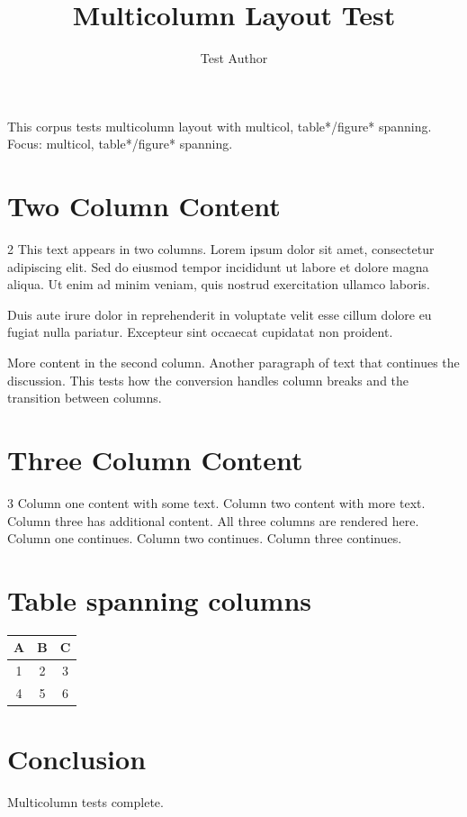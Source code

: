 \documentclass{article}
\title{Multicolumn Layout Test}
\author{Test Author}
\begin{document}
\maketitle

\begin{abstrct}
This corpus tests multicolumn layout with multicol, table*/figure* spanning.
Focus: multicol, table*/figure* spanning.
\end{abstrct}

\section{Two Column Content}

\begin{multicols}{2}
This text appears in two columns. Lorem ipsum dolor sit amet, consectetur
adipiscing elit. Sed do eiusmod tempor incididunt ut labore et dolore magna
aliqua. Ut enim ad minim veniam, quis nostrud exercitation ullamco laboris.

Duis aute irure dolor in reprehenderit in voluptate velit esse cillum dolore
eu fugiat nulla pariatur. Excepteur sint occaecat cupidatat non proident.

\columnbreak

More content in the second column. Another paragraph of text that continues
the discussion. This tests how the conversion handles column breaks and
the transition between columns.
\end{multicols}

\section{Three Column Content}

\begin{multicols}{3}
Column one content with some text. Column two content with more text.
Column three has additional content. All three columns are rendered here.
Column one continues. Column two continues. Column three continues.
\end{multicols}

\section{Table spanning columns}

\begin{center}
\begin{tabular}{ccc}
  \toprule
  A & B & C \\
  \midrule
  1 & 2 & 3 \\
  4 & 5 & 6 \\
  \bottomrule
\end{tabular}
\end{center}

\section{Conclusion}

Multicolumn tests complete.
\end{document}

